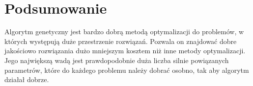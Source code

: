 \documentclass{article}
\begin{document}
	\section{Podsumowanie}
	Algorytm genetyczny jest bardzo dobrą metodą optymalizacji do problemów, w których występują duże przestrzenie rozwiązań. Pozwala on znajdować dobre jakościowo rozwiązania dużo mniejszym kosztem niż inne metody optymalizacji. Jego największą wadą jest prawdopodobnie duża liczba silnie powiązanych parametrów, które do każdego problemu należy dobrać osobno, tak aby algorytm działał dobrze.
\end{document}
